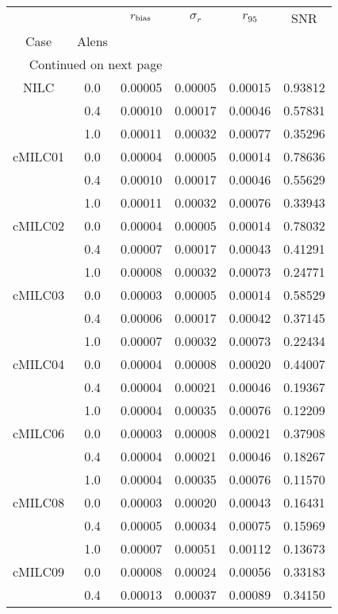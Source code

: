 \begin{longtable}{cccccc}
\toprule
     &     &  $r_{\rm bias}$  &  $\sigma_r$ &  $r_{95}$ &     SNR \\
Case & Alens &                  &             &           &         \\
\midrule
\endhead
\midrule
\multicolumn{3}{r}{{Continued on next page}} \\
\midrule
\endfoot

\bottomrule
\endlastfoot
NILC & 0.0 & 0.00005 & 0.00005 & 0.00015 & 0.93812 \\
     & 0.4 & 0.00010 & 0.00017 & 0.00046 & 0.57831 \\
     & 1.0 & 0.00011 & 0.00032 & 0.00077 & 0.35296 \\
cMILC01 & 0.0 & 0.00004 & 0.00005 & 0.00014 & 0.78636 \\
     & 0.4 & 0.00010 & 0.00017 & 0.00046 & 0.55629 \\
     & 1.0 & 0.00011 & 0.00032 & 0.00076 & 0.33943 \\
cMILC02 & 0.0 & 0.00004 & 0.00005 & 0.00014 & 0.78032 \\
     & 0.4 & 0.00007 & 0.00017 & 0.00043 & 0.41291 \\
     & 1.0 & 0.00008 & 0.00032 & 0.00073 & 0.24771 \\
cMILC03 & 0.0 & 0.00003 & 0.00005 & 0.00014 & 0.58529 \\
     & 0.4 & 0.00006 & 0.00017 & 0.00042 & 0.37145 \\
     & 1.0 & 0.00007 & 0.00032 & 0.00073 & 0.22434 \\
cMILC04 & 0.0 & 0.00004 & 0.00008 & 0.00020 & 0.44007 \\
     & 0.4 & 0.00004 & 0.00021 & 0.00046 & 0.19367 \\
     & 1.0 & 0.00004 & 0.00035 & 0.00076 & 0.12209 \\
cMILC06 & 0.0 & 0.00003 & 0.00008 & 0.00021 & 0.37908 \\
     & 0.4 & 0.00004 & 0.00021 & 0.00046 & 0.18267 \\
     & 1.0 & 0.00004 & 0.00035 & 0.00076 & 0.11570 \\
cMILC08 & 0.0 & 0.00003 & 0.00020 & 0.00043 & 0.16431 \\
     & 0.4 & 0.00005 & 0.00034 & 0.00075 & 0.15969 \\
     & 1.0 & 0.00007 & 0.00051 & 0.00112 & 0.13673 \\
cMILC09 & 0.0 & 0.00008 & 0.00024 & 0.00056 & 0.33183 \\
     & 0.4 & 0.00013 & 0.00037 & 0.00089 & 0.34150 \\

\end{longtable}
